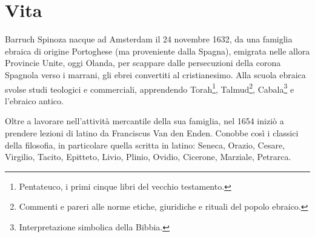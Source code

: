 \chapter{Vita}
Barruch Spinoza nacque ad Amsterdam  il 24 novembre 1632, da una famiglia ebraica di origine Portoghese (ma proveniente dalla Spagna), emigrata nelle allora Provincie Unite, oggi Olanda, per scappare dalle persecuzioni della corona Spagnola verso i marrani, gli ebrei convertiti al cristianesimo. Alla scuola ebraica svolse studi teologici e commerciali, apprendendo Torah\footnote{Pentateuco, i primi cinque libri del vecchio testamento.}, Talmud\footnote{Commenti e pareri alle norme etiche, giuridiche e rituali del popolo ebraico.}, Cabala\footnote{Interpretazione simbolica della Bibbia.} e l'ebraico antico.

Oltre a lavorare nell'attività mercantile della sua famiglia, nel 1654 iniziò a prendere lezioni di latino da Franciscus Van den Enden. Conobbe così i classici della filosofia, in particolare quella scritta in latino: Seneca, Orazio, Cesare, Virgilio, Tacito, Epitteto, Livio, Plinio, Ovidio, Cicerone, Marziale, Petrarca.

